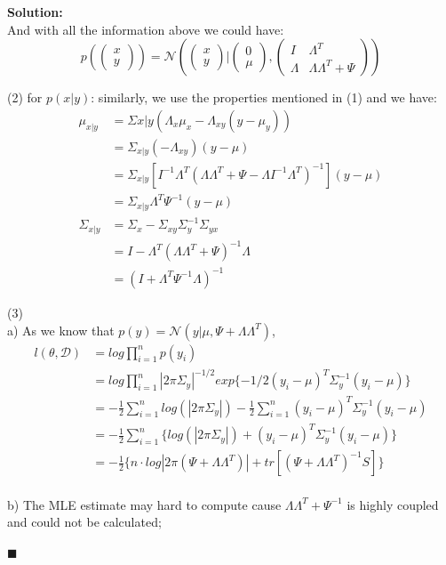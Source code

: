 \documentclass{article}
\newenvironment{solution}                               %
{\textbf{Solution:} \\}{$\blacksquare$\newline}         %
\newcommand{\Gaussian}{\mathcal{N}}                     %
\newcommand{\IdenMat}{\textit{I}}                       %
\begin{document}
\begin{solution}
        And with all the information above we could have:
        $$
        p(
            \begin{pmatrix}
                x \\ y
            \end{pmatrix}
        ) = 
        \Gaussian(
            \begin{pmatrix}
                x \\ y
            \end{pmatrix}
            |
            \begin{pmatrix}
                0 \\ \mu
            \end{pmatrix}
            ,
            \begin{pmatrix}
                \IdenMat & \Lambda^T \\
                \Lambda & \Lambda \Lambda^T + \Psi
            \end{pmatrix}
        )
        $$

        (2) for $p(x|y)$: similarly, we use the properties mentioned in (1) and we have:
        \begin{align*}
            \mu_{x|y} &= \Sigma{x|y}(\Lambda_{x}\mu_x-\Lambda_{xy}(y-\mu_y)) \\
            &= \Sigma_{x|y}(-\Lambda_{xy})(y-\mu) \\
            &= \Sigma_{x|y}[I^{-1} \Lambda^T (\Lambda \Lambda^T+\Psi-\Lambda I^{-1} \Lambda^T)^{-1}](y-\mu) \\
            &= \Sigma_{x|y} \Lambda^T \Psi^{-1}(y-\mu)
            \\
            \Sigma_{x|y} &= \Sigma_x - \Sigma_{xy} \Sigma_y^{-1} \Sigma_{yx} \\
            &= I - \Lambda^T (\Lambda \Lambda^T + \Psi)^{-1} \Lambda \\
            &= (I + \Lambda^T \Psi^{-1} \Lambda)^{-1}
        \end{align*}

        (3) \\
        a) As we know that $p(y) = \Gaussian(y|\mu, \Psi+\Lambda \Lambda^T)$,
        \begin{align*}
            l(\theta, \mathcal{D}) &= log \prod_{i=1}^{n}{p(y_i)} \\
            &= log \prod_{i=1}^{n} |2 \pi \Sigma_y|^{-1/2} exp\{-1/2 (y_i-\mu)^T \Sigma_y^{-1} (y_i-\mu)\} \\
            &= -\frac{1}{2} \sum_{i=1}^{n} log(|2 \pi \Sigma_y|)
               -\frac{1}{2} \sum_{i=1}^{n}{(y_i-\mu)^T \Sigma_y^{-1} (y_i-\mu)} \\
            &= -\frac{1}{2} \sum_{i=1}^{n} \{log(|2 \pi \Sigma_y|) + (y_i-\mu)^T \Sigma_y^{-1} (y_i-\mu)\} \\
            &= -\frac{1}{2} \{
                n \cdot log|2\pi(\Psi+\Lambda \Lambda^T)| + tr[(\Psi+\Lambda \Lambda^T)^{-1} S]
            \}
        \end{align*}
        \\
        b) The MLE estimate may hard to compute cause $\Lambda \Lambda^T + \Psi^{-1}$ is highly coupled and could not be calculated;


\end{solution}
\end{document}
